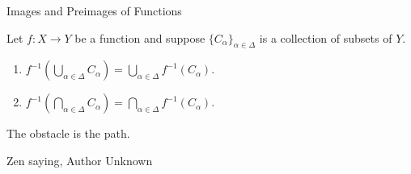 \begin{section}{Images and Preimages of Functions}
\begin{theorem}\label{thm:unions and intersections of preimages}
Let $f:X\to Y$ be a function and suppose $\{C_{\alpha}\}_{\alpha\in\Delta}$ is a collection of subsets of $Y$.
\begin{enumerate}[label=\textrm{(\alph*)}]
\item $\displaystyle f^{-1}\left(\bigcup_{\alpha\in\Delta} C_{\alpha}\right)=\bigcup_{\alpha\in\Delta} f^{-1}\left(C_{\alpha}\right)$.
\item $\displaystyle f^{-1}\left(\bigcap_{\alpha\in\Delta} C_{\alpha}\right)=\bigcap_{\alpha\in\Delta} f^{-1}\left(C_{\alpha}\right)$.
\end{enumerate}
\end{theorem}

\epigraph{The obstacle is the path.}{Zen saying, Author Unknown}

\end{section}
